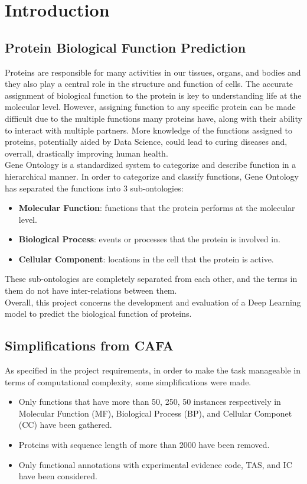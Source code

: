 \documentclass[10pt,twocolumn,letterpaper]{article}
\begin{document}
\section{Introduction}

\subsection{Protein Biological Function Prediction}
Proteins are responsible for many activities in our tissues, organs, and bodies and they also play a central role in the structure and function of cells.
The accurate assignment of biological function to the protein is key to understanding life at the molecular level. However, assigning function to any 
specific protein can be made difficult due to the multiple functions many proteins have, along with their ability 
to interact with multiple partners. More knowledge of the functions assigned to proteins, potentially aided by Data Science, could 
lead to curing diseases and, overrall, drastically improving human health.\\

Gene Ontology is a standardized system to categorize and describe function in a hierarchical manner.
In order to categorize and classify functions, Gene Ontology has separated the functions into 3 sub-ontologies:
\begin{itemize}
\item {\bf Molecular Function}: functions that the protein performs at the molecular level.
\item {\bf Biological Process}: events or processes that the protein is involved in.
\item {\bf Cellular Component}: locations in the cell that the protein is active. 
\end{itemize}
These sub-ontologies are completely separated from each other, and the terms in them do not have inter-relations between them. \\

Overall, this project concerns the development and evaluation of a Deep Learning model to predict the biological function of proteins.



\subsection{Simplifications from CAFA}
As specified in the project requirements, in order to make the task manageable in terms of computational complexity, some simplifications were made.
\begin{itemize}
\item Only functions that have more than 50, 250, 50 instances respectively in Molecular Function (MF), Biological Process (BP), and Cellular Componet (CC) have been gathered. 
\item Proteins with sequence length of more than 2000 have been removed.
\item Only functional annotations with experimental evidence code, TAS, and IC have been considered.
\end{itemize}
\end{document}
